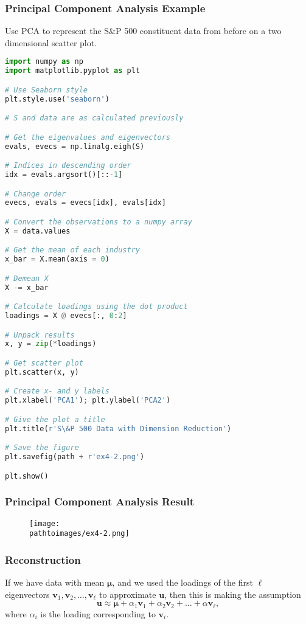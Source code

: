 \documentclass{beamer}
\newcommand{\pathtoimages}{/Users/charlesrambo/Desktop/Bootcamp24/Images}
\begin{document}
\begin{frame}[fragile]
\frametitle{Principal Component Analysis Example}
\begin{Example}
Use PCA to represent the S\&P 500 constituent data from before on a two dimensional scatter plot.
\end{Example}
\begin{multicols}{2}
\begin{lstlisting}[language=Python]
import numpy as np
import matplotlib.pyplot as plt

# Use Seaborn style
plt.style.use('seaborn')

# S and data are as calculated previously

# Get the eigenvalues and eigenvectors
evals, evecs = np.linalg.eigh(S)

# Indices in descending order
idx = evals.argsort()[::-1]

# Change order
evecs, evals = evecs[idx], evals[idx]

# Convert the observations to a numpy array
X = data.values

# Get the mean of each industry
x_bar = X.mean(axis = 0)

# Demean X
X -= x_bar

# Calculate loadings using the dot product
loadings = X @ evecs[:, 0:2]

# Unpack results
x, y = zip(*loadings)

# Get scatter plot
plt.scatter(x, y)

# Create x- and y labels
plt.xlabel('PCA1'); plt.ylabel('PCA2')

# Give the plot a title
plt.title(r'S\&P 500 Data with Dimension Reduction')

# Save the figure
plt.savefig(path + r'ex4-2.png')

plt.show()
\end{lstlisting}
\end{multicols}
\end{frame}

\begin{frame}
\frametitle{Principal Component Analysis Result}
\begin{figure}
\centering
\texttt{[image: \\pathtoimages/ex4-2.png]}
\end{figure}

\end{frame}

\begin{frame}
\frametitle{Reconstruction}
If we have data with mean $ {\boldsymbol \mu}$, and we used the loadings of the first $\ell$ eigenvectors ${\boldsymbol v_1}, {\boldsymbol v_2},\ldots, {\boldsymbol v_\ell}$ to approximate ${\boldsymbol u}$, then this is making the assumption
$$
{\boldsymbol u} \approx  {\boldsymbol \mu} + \alpha_1 {\boldsymbol v_1} + \alpha_2 {\boldsymbol v_2}+\ldots + \alpha {\boldsymbol v_\ell},
$$
where $\alpha_i$ is the loading corresponding to ${\boldsymbol v_i}$. 

\end{frame}
\end{document}
